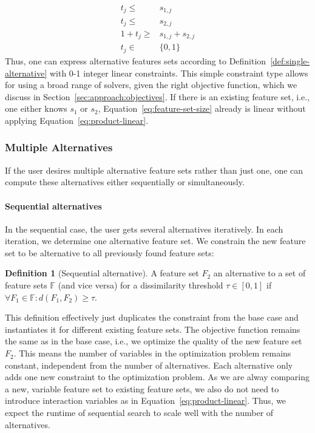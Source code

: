 \documentclass{article}
\theoremstyle{definition}
\newtheorem{definition}{Definition}
\begin{document}
%
\begin{align}
	t_j \leq& s_{1,j} \nonumber \\
	t_j \leq& s_{2,j} \nonumber \\
	1 + t_j \geq& s_{1,j} + s_{2,j} \nonumber \\
	t_j \in& \{0,1\}
	\label{eq:product-linear}
\end{align}
%
Thus, one can express alternative features sets according to Definition~\ref{def:single-alternative} with 0-1 integer linear constraints.
This simple constraint type allows for using a broad range of solvers, given the right objective function, which we discuss in Section~\ref{sec:approach:objectives}.
If there is an existing feature set, i.e., one either knows $s_1$ or $s_2$, Equation~\ref{eq:feature-set-size} already is linear without applying Equation~\ref{eq:product-linear}.

\subsubsection{Multiple Alternatives}
\label{sec:approach:constraints:multiple}

If the user desires multiple alternative feature sets rather than just one, one can compute these alternatives either sequentially or simultaneously.

\paragraph{Sequential alternatives}

In the sequential case, the user gets several alternatives iteratively.
In each iteration, we determine one alternative feature set.
We constrain the new feature set to be alternative to all previously found feature sets:
%
\begin{definition}[Sequential alternative]
	A feature set $F_2$ an alternative to a set of feature sets $\mathbb{F}$ (and vice versa) for a dissimilarity threshold $\tau \in [0,1]$ if $\forall F_1 \in \mathbb{F}: d(F_1,F_2) \geq \tau$.
	\label{def:sequential-alternative}
\end{definition}
%
This definition effectively just duplicates the constraint from the base case and instantiates it for different existing feature sets.
The objective function remains the same as in the base case, i.e., we optimize the quality of the new feature set~$F_2$.
This means the number of variables in the optimization problem remains constant, independent from the number of alternatives.
Each alternative only adds one new constraint to the optimization problem.
As we are alway comparing a new, variable feature set to existing feature sets, we also do not need to introduce interaction variables as in Equation~\ref{eq:product-linear}.
Thus, we expect the runtime of sequential search to scale well with the number of alternatives.
\end{document}
